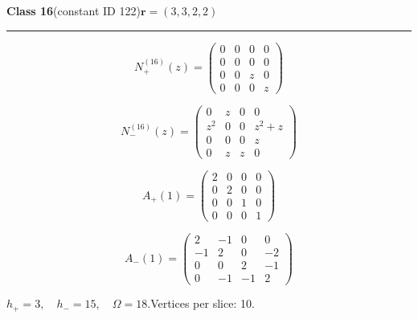 \noindent\begin{minipage}{\linewidth}
\noindent\textbf{Class 16}\quad\small (constant ID 122)\hfill $\symbf{r}=(3,3,2,2)$
\par\smallskip\noindent\textcolor{rulegray}{\rule{\linewidth}{0.3pt}}
\begin{minipage}[c]{0.495\linewidth}\centering\fontsize{9.7}{12}\selectfont
\setlength{\abovedisplayskip}{4pt}\setlength{\belowdisplayskip}{4pt}
\setlength{\abovedisplayshortskip}{4pt}\setlength{\belowdisplayshortskip}{4pt}
\setlength{\arraycolsep}{3pt}\renewcommand{\arraystretch}{1.08}
\[N_{+}^{(16)}(z)=\begin{pmatrix}0 & 0 & 0 & 0\\0 & 0 & 0 & 0\\0 & 0 & z & 0\\0 & 0 & 0 & z\end{pmatrix}\]
\end{minipage}%
\begin{minipage}[c]{0.495\linewidth}\centering\fontsize{9.7}{12}\selectfont
\setlength{\abovedisplayskip}{4pt}\setlength{\belowdisplayskip}{4pt}
\setlength{\abovedisplayshortskip}{4pt}\setlength{\belowdisplayshortskip}{4pt}
\setlength{\arraycolsep}{3pt}\renewcommand{\arraystretch}{1.08}
\[N_{-}^{(16)}(z)=\begin{pmatrix}0 & z & 0 & 0\\z^{2} & 0 & 0 & z^{2} + z\\0 & 0 & 0 & z\\0 & z & z & 0\end{pmatrix}\]
\end{minipage}%
\par\noindent
\begin{minipage}[c]{0.495\linewidth}\centering\fontsize{9.7}{12}\selectfont
\setlength{\abovedisplayskip}{4pt}\setlength{\belowdisplayskip}{4pt}
\setlength{\abovedisplayshortskip}{4pt}\setlength{\belowdisplayshortskip}{4pt}
\setlength{\arraycolsep}{3pt}\renewcommand{\arraystretch}{1.08}
\[A_{+}(1)=\begin{pmatrix}2 & 0 & 0 & 0\\0 & 2 & 0 & 0\\0 & 0 & 1 & 0\\0 & 0 & 0 & 1\end{pmatrix}\]
\end{minipage}%
\begin{minipage}[c]{0.495\linewidth}\centering\fontsize{9.7}{12}\selectfont
\setlength{\abovedisplayskip}{4pt}\setlength{\belowdisplayskip}{4pt}
\setlength{\abovedisplayshortskip}{4pt}\setlength{\belowdisplayshortskip}{4pt}
\setlength{\arraycolsep}{3pt}\renewcommand{\arraystretch}{1.08}
\[A_{-}(1)=\begin{pmatrix}2 & -1 & 0 & 0\\-1 & 2 & 0 & -2\\0 & 0 & 2 & -1\\0 & -1 & -1 & 2\end{pmatrix}\]
\end{minipage}%
\par\smallskip\noindent\small $h_+=3,\quad h_-=15,\quad \Omega=18.$\quad Vertices per slice: 10.
\end{minipage}\par\vfill
